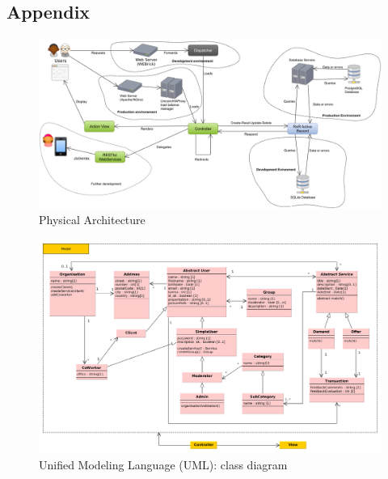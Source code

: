 \begin{landscape}

\section{Appendix}

\begin{figure}[!ht]
	\begin{center}
		\includegraphics[width=.825\paperheight]{physical_arch.png}
		\caption{Physical Architecture}
		\label{fig:physical_arch}
	\end{center}
\end{figure}

\begin{figure}[!ht]
	\begin{center}
		\includegraphics[width=.80\paperheight]{UML.png}
		\caption{Unified Modeling Language (UML): class diagram}
		\label{fig:uml}
	\end{center}
\end{figure}

\end{landscape}